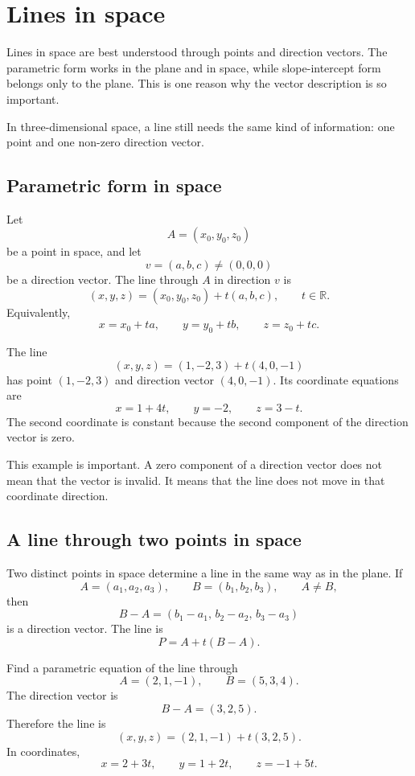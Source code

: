 \section{Lines in space}

Lines in space are best understood through points and direction vectors. The parametric form works in the plane and in space, while slope-intercept form belongs only to the plane. This is one reason why the vector description is so important.

In three-dimensional space, a line still needs the same kind of information: one point and one non-zero direction vector.

\subsection*{Parametric form in space}

Let
\[
A=(x_0,y_0,z_0)
\]
be a point in space, and let
\[
v=(a,b,c)\ne(0,0,0)
\]
be a direction vector. The line through \(A\) in direction \(v\) is
\[
(x,y,z)=(x_0,y_0,z_0)+t(a,b,c),
\qquad t\in\mathbb{R}.
\]
Equivalently,
\[
x=x_0+ta,
\qquad
y=y_0+tb,
\qquad
z=z_0+tc.
\]

\begin{examplebox}
The line
\[
(x,y,z)=(1,-2,3)+t(4,0,-1)
\]
has point \((1,-2,3)\) and direction vector \((4,0,-1)\). Its coordinate equations are
\[
x=1+4t,
\qquad
y=-2,
\qquad
z=3-t.
\]
The second coordinate is constant because the second component of the direction vector is zero.
\end{examplebox}

This example is important. A zero component of a direction vector does not mean that the vector is invalid. It means that the line does not move in that coordinate direction.

\subsection*{A line through two points in space}

Two distinct points in space determine a line in the same way as in the plane. If
\[
A=(a_1,a_2,a_3),
\qquad
B=(b_1,b_2,b_3),
\qquad
A\ne B,
\]
then
\[
B-A=(b_1-a_1,\,b_2-a_2,\,b_3-a_3)
\]
is a direction vector. The line is
\[
P=A+t(B-A).
\]

\begin{examplebox}
Find a parametric equation of the line through
\[
A=(2,1,-1),
\qquad
B=(5,3,4).
\]
The direction vector is
\[
B-A=(3,2,5).
\]
Therefore the line is
\[
(x,y,z)=(2,1,-1)+t(3,2,5).
\]
In coordinates,
\[
x=2+3t,
\qquad
y=1+2t,
\qquad
z=-1+5t.
\]
\end{examplebox}

